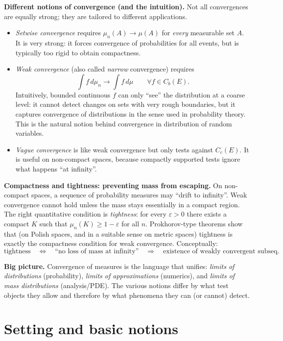 \noindent
\textbf{Different notions of convergence (and the intuition).}
Not all convergences are equally strong; they are tailored to different applications.
\begin{itemize}
\item \emph{Setwise convergence} requires $\mu_n(A)\to\mu(A)$ for \emph{every} measurable set $A$.
It is very strong: it forces convergence of probabilities for all events, but is typically too rigid to obtain compactness.
\item \emph{Weak convergence} (also called \emph{narrow} convergence) requires
\[
\int f\,d\mu_n \to \int f\,d\mu \qquad \forall f\in C_b(E).
\]
Intuitively, bounded continuous $f$ can only ``see'' the distribution at a coarse level:
it cannot detect changes on sets with very rough boundaries, but it captures convergence of distributions in the sense used in probability theory.
This is the natural notion behind convergence in distribution of random variables.
\item \emph{Vague convergence} is like weak convergence but only tests against $C_c(E)$.
It is useful on non-compact spaces, because compactly supported tests ignore what happens ``at infinity''.
\end{itemize}

\medskip

\noindent
\textbf{Compactness and tightness: preventing mass from escaping.}
On non-compact spaces, a sequence of probability measures may ``drift to infinity''.
Weak convergence cannot hold unless the mass stays essentially in a compact region.
The right quantitative condition is \emph{tightness}: for every $\varepsilon>0$ there exists a compact $K$ such that
$\mu_n(K)\ge 1-\varepsilon$ for all $n$.
Prokhorov-type theorems show that (on Polish spaces, and in a suitable sense on metric spaces) tightness is exactly the
compactness condition for weak convergence. Conceptually:
\[
\text{tightness} \quad \Longleftrightarrow \quad \text{``no loss of mass at infinity''} \quad
\Longrightarrow \quad \text{existence of weakly convergent subseq.}
\]

\medskip

\noindent
\textbf{Big picture.}
Convergence of measures is the language that unifies:
\emph{limits of distributions} (probability),
\emph{limits of approximations} (numerics),
and \emph{limits of mass distributions} (analysis/PDE).
The various notions differ by what test objects they allow and therefore by what phenomena they can (or cannot) detect.


\section{Setting and basic notions}

